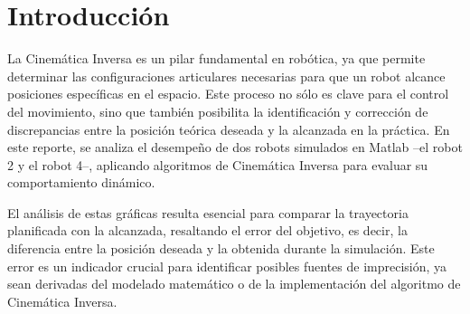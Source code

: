 \section{Introducción}
La Cinemática Inversa es un pilar fundamental en robótica, ya que permite determinar las configuraciones articulares necesarias para que un robot alcance posiciones específicas en el espacio. Este proceso no sólo es clave para el control del movimiento, sino que también posibilita la identificación y corrección de discrepancias entre la posición teórica deseada y la alcanzada en la práctica. En este reporte, se analiza el desempeño de dos robots simulados en Matlab –el robot 2 y el robot 4–, aplicando algoritmos de Cinemática Inversa para evaluar su comportamiento dinámico.

	\vspace{2em}

El análisis de estas gráficas resulta esencial para comparar la trayectoria planificada con la alcanzada, resaltando el error del objetivo, es decir, la diferencia entre la posición deseada y la obtenida durante la simulación. Este error es un indicador crucial para identificar posibles fuentes de imprecisión, ya sean derivadas del modelado matemático o de la implementación del algoritmo de Cinemática Inversa.